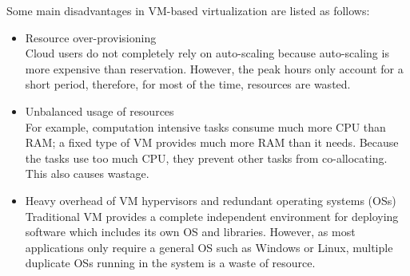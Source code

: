 Some main disadvantages in VM-based virtualization are listed as follows:
\begin{itemize}
	\item Resource over-provisioning \\
	 Cloud users do not completely rely on auto-scaling because auto-scaling is more expensive than reservation. However, the peak hours only account for a short period, therefore, for most of the time, resources are wasted.

	\item Unbalanced usage of resources \\
	For example, computation intensive tasks consume much more CPU than RAM; a fixed type of VM provides much more RAM than it needs. Because the tasks use too much CPU, they prevent other tasks from co-allocating. This also causes wastage.

	\item Heavy overhead of VM hypervisors and redundant operating systems (OSs) \\
	 Traditional VM provides a complete independent environment for deploying software which includes its own OS and libraries. However, as most applications only require a general OS such as Windows or Linux, multiple duplicate OSs running in the system is a waste of resource.
\end{itemize}


